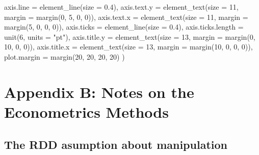 \documentclass[
  11pt,
]{article}
\newenvironment{Shaded}{\begin{snugshade}}{\end{snugshade}}
\newcommand{\AttributeTok}[1]{\textcolor[rgb]{0.77,0.63,0.00}{#1}}
\newcommand{\DecValTok}[1]{\textcolor[rgb]{0.00,0.00,0.81}{#1}}
\newcommand{\FloatTok}[1]{\textcolor[rgb]{0.00,0.00,0.81}{#1}}
\newcommand{\FunctionTok}[1]{\textcolor[rgb]{0.00,0.00,0.00}{#1}}
\newcommand{\NormalTok}[1]{#1}
\newcommand{\StringTok}[1]{\textcolor[rgb]{0.31,0.60,0.02}{#1}}
\begin{document}
\begin{Shaded}
\begin{Highlighting}[]
    \AttributeTok{axis.line =} \FunctionTok{element\_line}\NormalTok{(}\AttributeTok{size =} \FloatTok{0.4}\NormalTok{),}
    \AttributeTok{axis.text.y =} \FunctionTok{element\_text}\NormalTok{(}\AttributeTok{size =} \DecValTok{11}\NormalTok{, }\AttributeTok{margin =} \FunctionTok{margin}\NormalTok{(}\DecValTok{0}\NormalTok{, }\DecValTok{5}\NormalTok{, }\DecValTok{0}\NormalTok{, }\DecValTok{0}\NormalTok{)),}
    \AttributeTok{axis.text.x =} \FunctionTok{element\_text}\NormalTok{(}\AttributeTok{size =} \DecValTok{11}\NormalTok{, }\AttributeTok{margin =} \FunctionTok{margin}\NormalTok{(}\DecValTok{5}\NormalTok{, }\DecValTok{0}\NormalTok{, }\DecValTok{0}\NormalTok{, }\DecValTok{0}\NormalTok{)),}
    \AttributeTok{axis.ticks =} \FunctionTok{element\_line}\NormalTok{(}\AttributeTok{size =} \FloatTok{0.4}\NormalTok{),}
    \AttributeTok{axis.ticks.length =} \FunctionTok{unit}\NormalTok{(}\DecValTok{6}\NormalTok{, }\AttributeTok{units =} \StringTok{"pt"}\NormalTok{),}
    \AttributeTok{axis.title.y =} \FunctionTok{element\_text}\NormalTok{(}\AttributeTok{size =} \DecValTok{13}\NormalTok{, }\AttributeTok{margin =} \FunctionTok{margin}\NormalTok{(}\DecValTok{0}\NormalTok{, }\DecValTok{10}\NormalTok{, }\DecValTok{0}\NormalTok{, }\DecValTok{0}\NormalTok{)),}
    \AttributeTok{axis.title.x =} \FunctionTok{element\_text}\NormalTok{(}\AttributeTok{size =} \DecValTok{13}\NormalTok{, }\AttributeTok{margin =} \FunctionTok{margin}\NormalTok{(}\DecValTok{10}\NormalTok{, }\DecValTok{0}\NormalTok{, }\DecValTok{0}\NormalTok{, }\DecValTok{0}\NormalTok{)),}
    \AttributeTok{plot.margin =} \FunctionTok{margin}\NormalTok{(}\DecValTok{20}\NormalTok{, }\DecValTok{20}\NormalTok{, }\DecValTok{20}\NormalTok{, }\DecValTok{20}\NormalTok{)}
\NormalTok{  )}
\end{Highlighting}
\end{Shaded}

\newpage

\hypertarget{appendix-b-notes-on-the-econometrics-methods}{%
\section*{Appendix B: Notes on the Econometrics
Methods}\label{appendix-b-notes-on-the-econometrics-methods}}

\hypertarget{the-rdd-asumption-about-manipulation}{%
\subsection*{The RDD asumption about
manipulation}\label{the-rdd-asumption-about-manipulation}}
\end{document}
